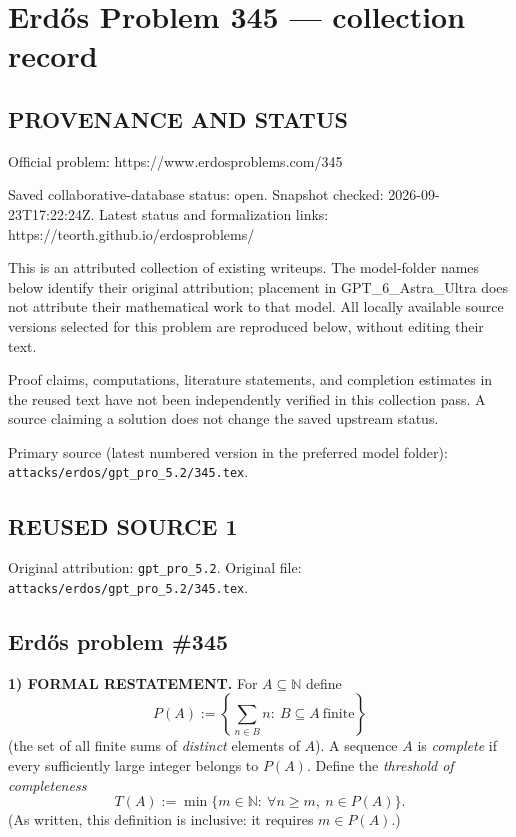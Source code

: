 \section*{Erd\H{o}s Problem 345 --- collection record}

\subsection*{PROVENANCE AND STATUS}
Official problem: https://www.erdosproblems.com/345

Saved collaborative-database status: open.
Snapshot checked: 2026-09-23T17:22:24Z.
Latest status and formalization links: https://teorth.github.io/erdosproblems/

This is an attributed collection of existing writeups. The model-folder names below identify their original attribution; placement in GPT\_6\_Astra\_Ultra does not attribute their mathematical work to that model. All locally available source versions selected for this problem are reproduced below, without editing their text.

Proof claims, computations, literature statements, and completion estimates in the reused text have not been independently verified in this collection pass. A source claiming a solution does not change the saved upstream status.

Primary source (latest numbered version in the preferred model folder): \texttt{attacks/erdos/gpt\_pro\_5.2/345.tex}.

\subsection*{REUSED SOURCE 1}
Original attribution: \texttt{gpt\_pro\_5.2}.
Original file: \texttt{attacks/erdos/gpt\_pro\_5.2/345.tex}.

\subsection*{Erd\H{o}s problem \#345}

\noindent\textbf{1) FORMAL RESTATEMENT.}
For $A\subseteq\mathbb{N}$ define
\[
P(A):=\left\{\sum_{n\in B} n:\ B\subseteq A\ \text{finite}\right\}
\]
(the set of all finite sums of \emph{distinct} elements of $A$).
A sequence $A$ is \emph{complete} if every sufficiently large integer belongs to $P(A)$.
Define the \emph{threshold of completeness}
\[
T(A):=\min\{m\in\mathbb{N}:\ \forall n\ge m,\ n\in P(A)\}.
\]
(As written, this definition is inclusive: it requires $m\in P(A)$.)

